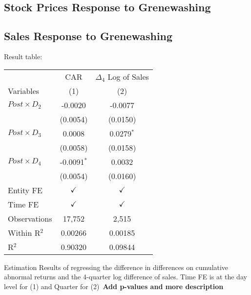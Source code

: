 \documentclass[12pt]{article}
\begin{document}
\subsection{Stock Prices Response to Grenewashing}
\subsection{Sales Response to Grenewashing}

Result table:

\begin{table}
    
    
    \centering
    \begin{tabular}{lcc}
        \toprule
        \toprule
                                    & CAR           & $\Delta_4$ Log of Sales \\
        Variables                   & (1)           & (2)\\
        \midrule
        $Post \times D_2$           & -0.0020       & -0.0077\\
                                    & (0.0054)      & (0.0150)\\
        $Post \times D_3$           & 0.0008        & 0.0279$^{*}$\\
                                    & (0.0058)      & (0.0158)\\
        $Post \times D_4$           & -0.0091$^{*}$ & 0.0032\\
                                    & (0.0054)      & (0.0160)\\
        Entity FE                   & $\checkmark$  & $\checkmark$\\
        Time FE                     & $\checkmark$  & $\checkmark$\\
        Observations                & 17,752        & 2,515\\
        Within R$^2$                & 0.00266       & 0.00185\\
        R$^2$                       & 0.90320       & 0.09844\\  
        \bottomrule
    \end{tabular}
    
    \begin{tablenotes}
        \footnotesize
    \item Estimation Results of regressing the difference in differences on cumulative abnormal returns and the 4-quarter log difference of sales. Time FE is at the day level for (1) and Quarter for (2)\ \textbf{Add p-values and more description}
    \end{tablenotes}
\end{table}
\end{document}
